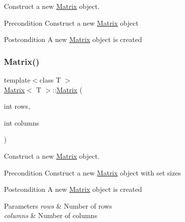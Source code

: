 Construct a new \mbox{\hyperlink{class_matrix}{Matrix}} object. 

\begin{DoxyPrecond}{Precondition}
Construct a new \mbox{\hyperlink{class_matrix}{Matrix}} object 
\end{DoxyPrecond}
\begin{DoxyPostcond}{Postcondition}
A new \mbox{\hyperlink{class_matrix}{Matrix}} object is created 
\end{DoxyPostcond}
\mbox{\label{class_matrix_a44eb4cf3a243fe027112d1ace474ead9}} 
\subsubsection{\texorpdfstring{Matrix()}{Matrix()}\hspace{0.1cm}{\footnotesize\ttfamily [2/4]}}
{\footnotesize\ttfamily template$<$class T $>$ \\
\mbox{\hyperlink{class_matrix}{Matrix}}$<$ T $>$\+::\mbox{\hyperlink{class_matrix}{Matrix}} (\begin{DoxyParamCaption}\item[{int}]{rows,  }\item[{int}]{columns }\end{DoxyParamCaption})}



Construct a new \mbox{\hyperlink{class_matrix}{Matrix}} object. 

\begin{DoxyPrecond}{Precondition}
Construct a new \mbox{\hyperlink{class_matrix}{Matrix}} object with set sizes 
\end{DoxyPrecond}
\begin{DoxyPostcond}{Postcondition}
A new \mbox{\hyperlink{class_matrix}{Matrix}} object is created 
\end{DoxyPostcond}

\begin{DoxyParams}{Parameters}
{\em rows} & Number of rows \\
\hline
{\em columns} & Number of columns \\
\hline
\end{DoxyParams}
\mbox{\label{class_matrix_abc1e84ee28720ecc8a6807bb3f09f43e}} 
